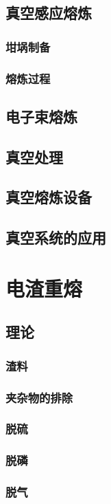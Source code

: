 \documentclass[UTF8]{../../ApplicationUniverse}
\begin{document}
    \subsection{真空感应熔炼}
        \subsubsection{坩埚制备}
        \subsubsection{熔炼过程}
    \subsection{电子束熔炼}
    \subsection{真空处理}
    \subsection{真空熔炼设备}
    \subsection{真空系统的应用}
\section{电渣重熔}
    \subsection{理论}
        \subsubsection{渣料}
        \subsubsection{夹杂物的排除}
        \subsubsection{脱硫}
        \subsubsection{脱磷}
        \subsubsection{脱气}
\end{document}
